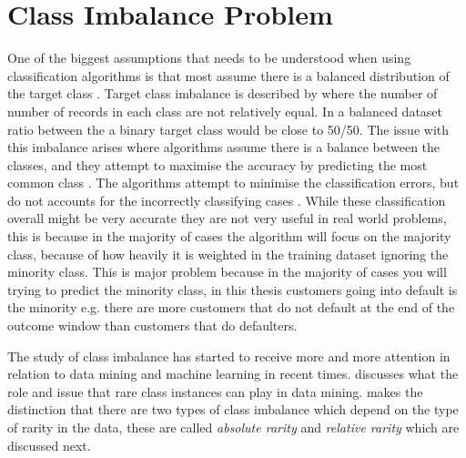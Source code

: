 \begin{comment}
\subsection{Correlation-based Feature Selection}
\subsection{Information Gain}
\subsection{Coarse Classification/ Binning}
\end{comment}

\section{Class Imbalance Problem}\label{sec:imBalance}
One of the biggest assumptions that needs to be understood when using classification algorithms is that most assume there is a balanced distribution of the target class \citep{japkowicz_class_2000}. Target class imbalance is described by  \citep{chawla_smote:_2002} where the number of number of records in each class are not relatively equal. In a balanced dataset ratio between the a binary target class would be close to 50/50. The issue with this imbalance arises where algorithms assume there is a balance between the classes, and they attempt to maximise the accuracy by predicting the most common class \citep{drummond_severe_2005}. The algorithms attempt to minimise the classification errors, but do not accounts for the incorrectly classifying cases \citep{seiffert_improving_2009}. While these classification overall might be very accurate they are not very useful in real world problems, this is because in the majority of cases the algorithm will focus on the majority class, because of how heavily it is weighted in the training dataset ignoring the minority class. This is major problem because in the majority of cases you will trying to predict the minority class, in this thesis customers going into default is the minority e.g. there are more customers that do not default at the end of the outcome window than customers that do defaulters.

The study of class imbalance has started to receive more and more attention in relation to data mining and machine learning in recent times. \cite{weiss_mining_2004} discusses what the role and issue that rare class instances can play in data mining. \cite{weiss_mining_2004} makes the distinction that there are two types of class imbalance which depend on the type of rarity in the data, these are called \textit{absolute rarity} and \textit{relative rarity} which are discussed next.

